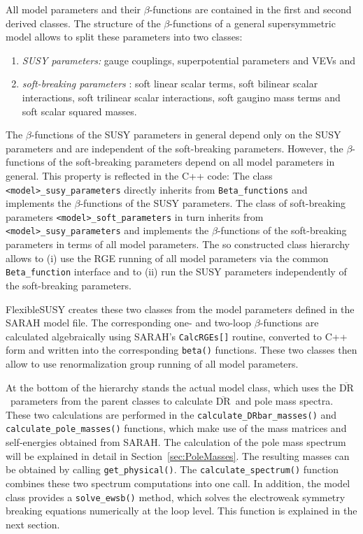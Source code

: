\documentclass[final,3p,11pt,pdflatex]{elsarticle}
\makeatletter
\newcommand{\fs}{FlexibleSUSY\@\xspace}
\newcommand{\code}[1]{\lstinline|#1|}  %
\newcommand{\textoverline}[1]{$\overline{\mbox{#1}}$}
\newcommand{\DRbar}{\textoverline{DR}\xspace}
\newcommand{\secref}[1]{Section~\ref{#1}}
\makeatother
\begin{document}
All model parameters and their $\beta$-functions are contained in
the first and second derived classes.  The structure of the
$\beta$-functions of a general supersymmetric model
\cite{Jones:1974pg,Jones:1983vk,West:1984dg,Martin:1993yx,Yamada:1993ga,Jack:1994kd,Jack:1994rk,Yam94,MV94,Fonseca:2011vn,Goodsell:2012fm,Sperling:2013eva,Sperling:2013xqa}
allows to split these parameters into two classes:
%
\begin{enumerate}
\item \emph{SUSY parameters:} gauge couplings, superpotential
  parameters and VEVs and
\item \emph{soft-breaking parameters} \cite{Girardello:1981wz}: soft
  linear scalar terms, soft bilinear scalar interactions, soft
  trilinear scalar interactions, soft gaugino mass terms and soft
  scalar squared masses.
\end{enumerate}
%
The $\beta$-functions of the SUSY parameters in general depend only on
the SUSY parameters and are independent of the soft-breaking
parameters.  However, the $\beta$-functions of the soft-breaking
parameters depend on all model parameters in general.
%
This property is reflected in the C++ code: The class
\code{<model>_susy_parameters} directly inherits from
\code{Beta_functions} and implements the $\beta$-functions of the SUSY
parameters.  The class of soft-breaking parameters
\code{<model>_soft_parameters} in turn inherits from
\code{<model>_susy_parameters} and implements the $\beta$-functions of
the soft-breaking parameters in terms of all model parameters.  The so
constructed class hierarchy allows to (i) use the RGE running of all
model parameters via the common \code{Beta_function} interface and to
(ii) run the SUSY parameters independently of the soft-breaking
parameters.

\fs creates these two classes from the model parameters defined in the
SARAH model file.  The corresponding one- and two-loop
$\beta$-functions are calculated algebraically using SARAH's
\code{CalcRGEs[]} routine, converted to C++ form and written into the
corresponding \code{beta()} functions.  These two classes then allow
to use renormalization group running of all model parameters.

At the bottom of the hierarchy stands the actual model class, which
uses the \DRbar\ parameters from the parent classes to calculate
\DRbar\ and pole mass spectra.  These two calculations are performed
in the \code{calculate_DRbar_masses()} and
\code{calculate_pole_masses()} functions, which make use of the mass
matrices and self-energies obtained from SARAH.  The calculation of
the pole mass spectrum will be explained in detail in
\secref{sec:PoleMasses}.  The resulting masses can be obtained by
calling \code{get_physical()}.  The \code{calculate_spectrum()}
function combines these two spectrum computations into one call.  In
addition, the model class provides a \code{solve_ewsb()} method, which
solves the electroweak symmetry breaking equations numerically at the
loop level.  This function is explained in the next section.
\end{document}
